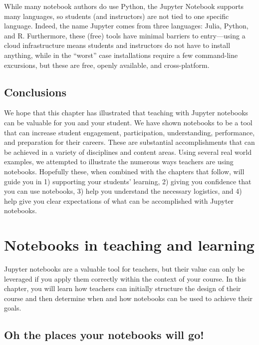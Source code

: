 \documentclass[]{book}
\begin{document}
While many notebook authors do use Python, the Jupyter Notebook supports
many languages, so students (and instructors) are not tied to one
specific language. Indeed, the name Jupyter comes from three languages:
Julia, Python, and R. Furthermore, these (free) tools have minimal
barriers to entry---using a cloud infrastructure means students and
instructors do not have to install anything, while in the ``worst'' case
installations require a few command-line excursions, but these are free,
openly available, and cross-platform.

\section{Conclusions}\label{conclusions}

We hope that this chapter has illustrated that teaching with Jupyter
notebooks can be valuable for you and your student. We have shown
notebooks to be a tool that can increase student engagement,
participation, understanding, performance, and preparation for their
careers. These are substantial accomplishments that can be achieved in a
variety of disciplines and content areas. Using several real world
examples, we attempted to illustrate the numerous ways teachers are
using notebooks. Hopefully these, when combined with the chapters that
follow, will guide you in 1) supporting your students' learning, 2)
giving you confidence that you can use notebooks, 3) help you understand
the necessary logistics, and 4) help give you clear expectations of what
can be accomplished with Jupyter notebooks.

\chapter{Notebooks in teaching and
learning}\label{notebooks-in-teaching-and-learning}

Jupyter notebooks are a valuable tool for teachers, but their value can
only be leveraged if you apply them correctly within the context of your
course. In this chapter, you will learn how teachers can initially
structure the design of their course and then determine when and how
notebooks can be used to achieve their goals.

\section{Oh the places your notebooks will
go!}\label{oh-the-places-your-notebooks-will-go}
\end{document}
